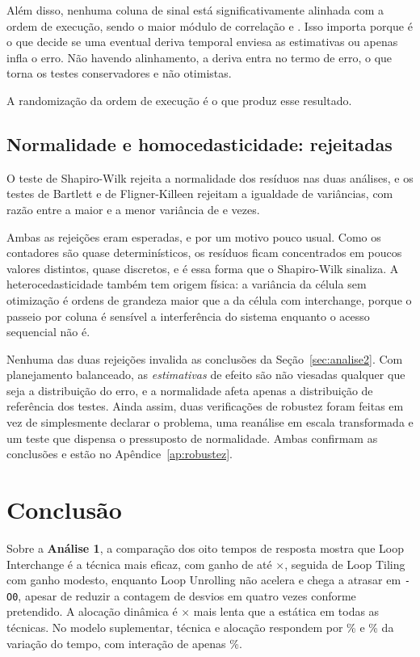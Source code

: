 \documentclass[11pt,a4paper]{article}
\begin{document}
Além disso, nenhuma coluna de sinal está significativamente alinhada com a ordem de
execução, sendo o maior módulo de correlação \valFatUmAlinhaMax{} e
\valFatDoisAlinhaMax. Isso importa porque é o que decide se uma eventual deriva temporal
enviesa as estimativas ou apenas infla o erro. Não havendo alinhamento, a deriva entra no
termo de erro, o que torna os testes conservadores e não otimistas.

A randomização da ordem de execução é o que produz esse resultado.

\subsection{Normalidade e homocedasticidade: rejeitadas}

O teste de Shapiro-Wilk rejeita a normalidade dos resíduos nas duas análises, e os testes
de Bartlett e de Fligner-Killeen rejeitam a igualdade de variâncias, com razão entre a
maior e a menor variância de \valFatUmRazaoVar{} e \valFatDoisRazaoVar{} vezes.

Ambas as rejeições eram esperadas, e por um motivo pouco usual. Como os contadores são
quase determinísticos, os resíduos ficam concentrados em poucos valores distintos, quase
discretos, e é essa forma que o Shapiro-Wilk sinaliza. A heterocedasticidade também tem
origem física: a variância da célula sem otimização é ordens de grandeza maior que a da
célula com interchange, porque o passeio por coluna é sensível a interferência do sistema
enquanto o acesso sequencial não é.

Nenhuma das duas rejeições invalida as conclusões da Seção~\ref{sec:analise2}. Com
planejamento balanceado, as \emph{estimativas} de efeito são não viesadas qualquer que
seja a distribuição do erro, e a normalidade afeta apenas a distribuição de referência dos
testes. Ainda assim, duas verificações de robustez foram feitas em vez de simplesmente
declarar o problema, uma reanálise em escala transformada e um teste que dispensa o
pressuposto de normalidade. Ambas confirmam as conclusões e estão no
Apêndice~\ref{ap:robustez}.

\section{Conclusão}

Sobre a \textbf{Análise 1}, a comparação dos oito tempos de resposta mostra que Loop
Interchange é a técnica mais eficaz, com ganho de até \valGanhoEstInter$\times$, seguida
de Loop Tiling com ganho modesto, enquanto Loop Unrolling não acelera e chega a atrasar em
\texttt{-O0}, apesar de reduzir a contagem de desvios em quatro vezes conforme pretendido.
A alocação dinâmica é \valRazaoAloc$\times$ mais lenta que a estática em todas as
técnicas. No modelo suplementar, técnica e alocação respondem por \valPctTec\% e
\valPctAloc\% da variação do tempo, com interação de apenas \valPctInter\%.
\end{document}
